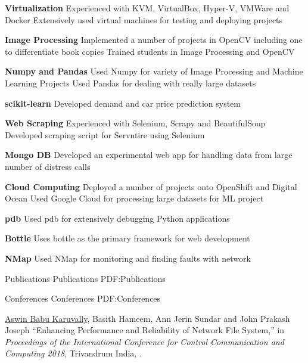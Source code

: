\documentclass[letterpaper,MMMyyyy,nonstopmode]{simpleresumecv}
\begin{document}
\begin{Body}
\BigGap
\BulletItem
\textbf{Virtualization}
\SubBulletItem
Experienced with KVM, VirtualBox, Hyper-V, VMWare and Docker
\SubBulletItem
Extensively used virtual machines for testing and deploying projects

\BigGap
\BulletItem
\textbf{Image Processing}
\SubBulletItem
Implemented a number of projects in OpenCV including one to differentiate book
copies
\SubBulletItem
Trained students in Image Processing and OpenCV

\BigGap
\BulletItem
\textbf{Numpy and Pandas}
\SubBulletItem
Used Numpy for variety of Image Processing and Machine Learning Projects
\SubBulletItem
Used Pandas for dealing with really large datasets

\BigGap
\BulletItem
\textbf{scikit-learn}
\SubBulletItem
Developed demand and car price prediction system

\BigGap
\BulletItem
\textbf{Web Scraping}
\SubBulletItem
Experienced with Selenium, Scrapy and BeautifulSoup
\SubBulletItem
Developed scraping script for Servntire using Selenium

\BigGap
\BulletItem
\textbf{Mongo DB}
\SubBulletItem
Developed an experimental web app for handling data from large number of
distress calls

\BigGap
\BulletItem
\textbf{Cloud Computing}
\SubBulletItem
Deployed a number of projects onto OpenShift and Digital Ocean
\SubBulletItem
Used Google Cloud for processing large datasets for ML project

\BigGap
\BulletItem
\textbf{pdb}
\SubBulletItem
Used pdb for extensively debugging Python applications

\BigGap
\BulletItem
\textbf{Bottle}
\SubBulletItem
Uses bottle as the primary framework for web development

\BigGap
\BulletItem
\textbf{NMap}
\SubBulletItem
Used NMap for monitoring and finding faults with network


\pagebreak
\Section
{Publications}
{Publications}
{PDF:Publications}

\SubSection
{Conferences}
{Conferences}
{PDF:Conferences}

\begingroup
\renewcommand{\MaxNumberedItem}{[8888]}

\NumberedItem{[1]}
{\underline{Aswin Babu Karuvally}, Basith Hameem, Ann Jerin Sundar and John
Prakash Joseph ``Enhancing Performance and Reliability of Network File System,''
in \textit{Proceedings of the International Conference for Control Communication
and Computing 2018}, Trivandrum India,
.}


\end{Body}
\end{document}
